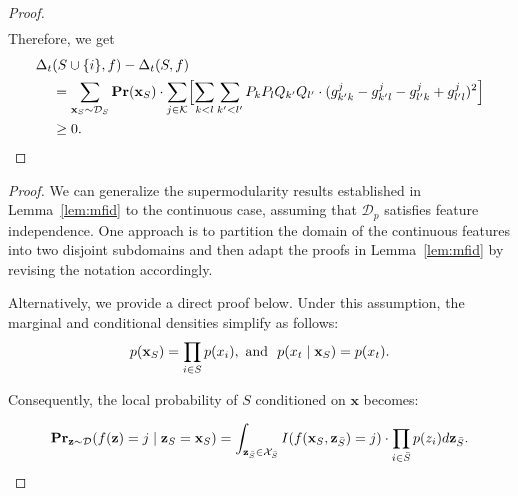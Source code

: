 \documentclass{article}
\newcommand{\z}{\textbf{z}}
\newcommand{\x}{\textbf{x}}
\newcommand{\fml}[1]{{\mathcal{#1}}}
\newcommand{\mbf}[1]{\ensuremath\mathbf{#1}}
\begin{document}
\begin{proof}
\begin{equation}
\begin{aligned}
\end{aligned}
\end{equation}
%
Therefore, we get 
\begin{equation}
\begin{aligned}
\Delta_{t}&(S\cup\{i\},f) - \Delta_{t}(S,f) \\
&= \sum_{\x_{S}\sim \fml{D}_{S}} \mbf{Pr}(\x_{S}) \cdot \sum_{j \in \fml{K}} 
\Bigl[\sum_{k < l} \sum_{k' < l'} P_{k} P_{l} Q_{k'} Q_{l'} \cdot (g_{k'k}^{j} - g_{k'l}^{j} - g_{l'k}^{j} + g_{l'l}^{j})^2\Bigr] \\
&\ge 0.
%
\end{aligned}
\end{equation}

\end{proof}


\globalsupermodular*
%
\begin{proof}

We can generalize the supermodularity results established in Lemma~\ref{lem:mfid} to the continuous case, assuming that $\fml{D}_p$ satisfies feature independence.
One approach is to partition the domain of the continuous features into two disjoint subdomains and then adapt the proofs in Lemma~\ref{lem:mfid} by revising the notation accordingly.

Alternatively, we provide a direct proof below.
Under this assumption, the marginal and conditional densities simplify as follows:
%
\begin{equation}
p(\x_{S}) = \prod_{i\in S} p(x_i),~\textnormal{and}~~p(x_t \mid \x_{S}) = p(x_t).
\end{equation}

Consequently, the local probability of $S$ conditioned on $\x$ becomes:

\begin{equation}
\mbf{Pr}_{\z\sim \mathcal{D}}(f(\z) = j \mid \z_{S} = \x_{S})
=\int_{\z_{\bar{S}} \in \fml{X}_{\bar{S}}} I(f(\x_{S}, \z_{\bar{S}})=j) \cdot \prod_{i\in \bar{S}} p(z_i) d\z_{\bar{S}}.
\end{equation}



\end{proof}
\end{document}
